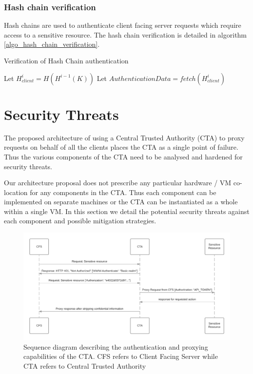 \documentclass{sig-alternate-05-2015}
\begin{document}
\subsubsection{Hash chain verification}
Hash chains are used to authenticate client facing server requests which require access to a sensitive resource. The hash chain verification is detailed in algorithm \ref{algo_hash_chain_verification}.

\begin{algorithm}
\label{algo_hash_chain_verification}
\SetAlgoLined
\caption{Verification of Hash Chain authentication}
\LinesNumbered
{}
	Let $H_{client}^{i} = H(H^{i-1}(K))$ \;
	Let $AuthenticationData = fetch(H_{client}^{i})$ \;
	
\end{algorithm}


\section{Security Threats}

The proposed architecture of using a Central Trusted Authority (CTA) to proxy requests on behalf of all the clients places the CTA as a single point of failure. Thus the various components of the CTA need to be analysed and hardened for security threats. 

Our architecture proposal does not prescribe any particular hardware / VM co-location for any components in the CTA. Thus each component can be implemented on separate machines or the CTA can be instantiated as a whole within a single VM. In this section we detail the potential security threats against each component and possible mitigation strategies.

\begin{figure}[!ht]
  \centering
  \includegraphics[keepaspectratio=true,scale=0.2]{sequence_diagram}
  \caption{Sequence diagram describing the authentication and proxying capabilities of the CTA. CFS refers to Client Facing Server while CTA refers to Central Trusted Authority}
  \label{fig:ctaarchitecture}
\end{figure}
\end{document}
